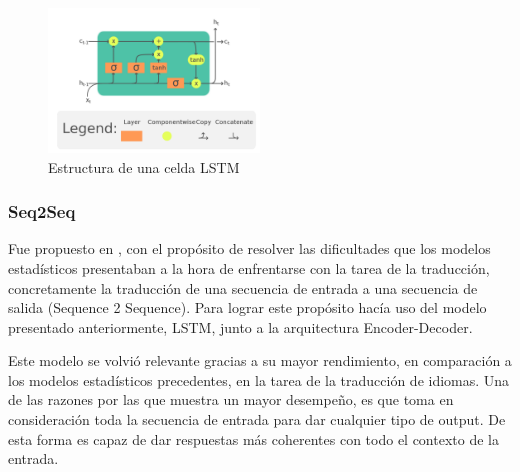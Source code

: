 \begin{figure}[h]
	\centering
	\includegraphics[width = 0.5\textwidth]{Imagenes/Vectorial/LSTM.pdf}
	\caption{Estructura de una celda LSTM}%
	\label{fig:LSTM}
\end{figure}

\subsubsection{Seq2Seq}

Fue propuesto en \cite{sutskever2014sequence}, con el propósito de resolver las dificultades que los modelos estadísticos presentaban a la hora de enfrentarse con la tarea de la traducción, concretamente la traducción de una secuencia de entrada a una secuencia de salida (Sequence 2 Sequence). Para lograr este propósito hacía uso del modelo presentado anteriormente, LSTM, junto a la arquitectura Encoder-Decoder. 

Este modelo se volvió relevante gracias a su mayor rendimiento, en comparación a los modelos estadísticos precedentes, en la tarea de la traducción de idiomas. Una de las razones por las que muestra un mayor desempeño, es que toma en consideración toda la secuencia de entrada para dar cualquier tipo de output. De esta forma es capaz de dar respuestas más coherentes con todo el contexto de la entrada.

